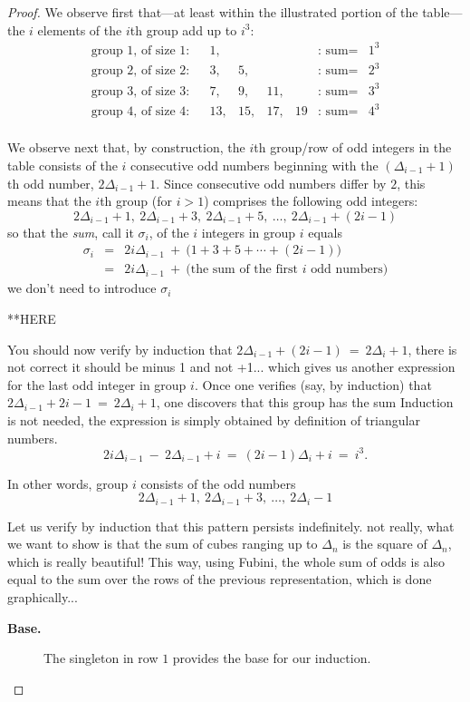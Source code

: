 \begin{proof}
We observe first that---at least within the illustrated portion of the table---the $i$ elements
of the $i$th group add up to $i^3$:
\[
\begin{array}{llrrrrclcc}
\mbox{group $1$, of size 1:} & &
1,  &    &     &     & \mbox{: sum} = &  1^3 \\
\mbox{group $2$, of size 2:} & &
3,  &  5, &     &    & \mbox{: sum} =  &  2^3 \\
\mbox{group $3$, of size 3:} & &
7,  &  9, & 11, &    &  \mbox{: sum} = &  3^3 \\
\mbox{group $4$, of size 4:} & &
13, & 15, & 17, & 19 & \mbox{: sum} =  &  4^3 \\
\end{array}
\]

We observe next that, by construction, the $i$th group/row of odd integers in the table consists of the
$i$ consecutive odd numbers beginning with the $\left( \Delta_{i-1} +1 \right)$th odd number,
$2 \Delta_{i-1} +1$.  Since consecutive odd numbers differ by $2$, this means that the $i$th
group (for $i>1$) comprises the following odd integers:
\[
2 \Delta_{i-1} +1, \ 2 \Delta_{i-1}  +3, \ 2 \Delta_{i-1}  +5 , \
\ldots, \ 2 \Delta_{i-1} + (2i-1)
\]
so that the {\em sum}, call it $\sigma_i$, of the $i$ integers in group $i$ equals
\begin{eqnarray*}
\sigma_i  & = & 2 i \Delta_{i-1} \ + \ \big( 1 + 3 + 5 + \cdots + (2i-1) \big) \\
       & = & 2 i \Delta_{i-1} \ + \ \mbox{(the sum of the first $i$ odd numbers)}
\end{eqnarray*}
{\Denis we don't need to introduce $\sigma_i$}

**HERE

You should now verify by induction that $2 \Delta_{i-1} +(2i-1) \ = \ 2 \Delta_{i} +1$, 
{\Denis there is not correct it should be minus 1 and not +1...} which gives us another
expression for the last odd integer in group $i$.  
Once one verifies (say, by induction) that $2 \Delta_{i-1} +2i-1 \ = \ 2
\Delta_{i} +1$, one discovers that this group has the sum
{\Denis Induction is not needed, the expression is simply obtained by definition of triangular numbers.}
\[
2i \Delta_{i-1}  \ - \ 2 \Delta_{i-1} +i  \  = \
(2i -1) \Delta_i + i \ = \ i^3.
\]

In other words, group $i$ consists of the odd numbers
\[ 2 \Delta_{i-1} +1, \ 2 \Delta_{i-1} +3, \  \ldots, \  2\Delta_i -1 \]


Let us verify by induction that this pattern persists indefinitely.
{\Denis not really, what we want to show is that the sum of cubes ranging up to $\Delta_n$
is the square of $\Delta_n$, which is really beautiful!
This way, using Fubini, the whole sum of odds is also equal to the sum over the rows of the previous representation, 
which is done graphically...}
\begin{description}
\item[{\bf Base.}]
The singleton in row $1$ provides the base for our induction.


\end{description}
\end{proof}
